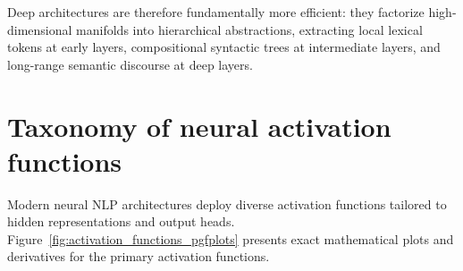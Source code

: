 \documentclass[../../main.tex]{subfiles}
\begin{document}
Deep architectures are therefore fundamentally more efficient: they factorize high-dimensional manifolds into hierarchical abstractions, extracting local lexical tokens at early layers, compositional syntactic trees at intermediate layers, and long-range semantic discourse at deep layers.

\clearpage
\section{Taxonomy of neural activation functions}
\label{sec:activations_taxonomy}

Modern neural NLP architectures deploy diverse activation functions tailored to hidden representations and output heads. Figure~\ref{fig:activation_functions_pgfplots} presents exact mathematical plots and derivatives for the primary activation functions.
\end{document}
